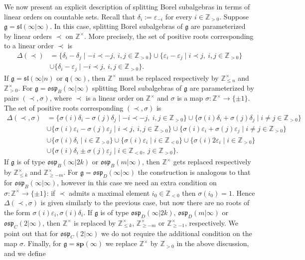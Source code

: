 \documentclass[12pt]{amsart}
\newcommand\Z{\mathbb{Z}}
\newcommand\g{\mathfrak{g}}
\newcommand\fq{\mathfrak{q}}
\newcommand\fsl{\mathfrak{sl}}
\newcommand\fosp{\mathfrak{osp}}
\newcommand\D{\Delta}
\newcommand\bsp{\mathbf{sp}}
\theoremstyle{plain}
\theoremstyle{definition}
\numberwithin{equation}{section}
\begin{document}
We now present an explicit description of splitting Borel subalgebras in terms of linear orders on countable sets. Recall that $\delta_i:=\varepsilon_{-i}$ for every $i\in \Z_{>0}$. Suppose $\g=\fsl(\infty|\infty)$. In this case, splitting Borel subalgebras of $\g$ are parameterized by linear orders $\prec$ on $\Z^\times $. More precisely, the set of positive roots corresponding to a linear order $\prec$ is 
\begin{align*}
\D(\prec) & = \{\delta_i - \delta_j\mid -i\prec -j,\ i,j\in \Z_{>0}\}\cup \{\varepsilon_i - \varepsilon_j\mid i\prec j,\ i,j\in \Z_{>0}\} \\
& \cup \{\delta_i - \varepsilon_j\mid -i\prec j,\ i,j\in \Z_{>0}\}.
\end{align*}
If $\g=\fsl(\infty|n)$ or $\fq(\infty)$, then $\Z^\times$ must be replaced respectively by $\Z_{\leq n}^\times$ and $\Z_{>0}^\times$. For $\g = \fosp_B(\infty|\infty)$ splitting Borel subalgebras of $\g$ are parameterized by pairs $(\prec, \sigma)$, where $\prec$ is a linear order on $\Z^\times $ and $\sigma$ is a map $\sigma : \Z^\times \to \{\pm 1\}$. The set of positive roots corresponding $(\prec, \sigma)$ is
\begin{align*}
\D(\prec, \sigma) & = \{\sigma(i)\delta_i - \sigma(j)\delta_j\mid -i\prec -j,\ i,j\in \Z_{>0}\}\cup \{\sigma(i)\delta_i + \sigma(j)\delta_j\mid i\neq j\in \Z_{>0}\} \\
& \cup \{\sigma(i)\varepsilon_i - \sigma(j)\varepsilon_j\mid i\prec j,\ i,j\in \Z_{>0}\}\cup \{\sigma(i)\varepsilon_i + \sigma(j)\varepsilon_j\mid i\neq j\in \Z_{>0}\} \\
& \cup  \{\sigma(i)\delta_i \mid i\in \Z_{>0}\} \cup  \{\sigma(i)\varepsilon_i \mid i\in \Z_{<0}\} 
\cup  \{\sigma(i)2\varepsilon_i \mid i\in \Z_{>0}\} \\
& \cup \{\sigma(i)\delta_i \pm  \sigma(j)\varepsilon_j\mid i\in \Z_{<0},\ j\in \Z_{>0}\}.
\end{align*}
If $\g$ is of type $\fosp_B(\infty|2k)$ or $\fosp_B(m|\infty)$, then $\Z^\times $ gets replaced respectively by $\Z_{\leq k}^\times$ and $\Z_{\geq -m}^\times$. For $\g=\fosp_D(\infty|\infty)$ the construction is analogous to that for $\fosp_B(\infty|\infty)$, however in this case we need an extra condition on $\sigma : \Z^\times \to \{\pm 1\}$: if $\prec$ admits a maximal element $i_0\in \Z_{<0}$ then $\sigma(i_0)=1$. Hence $\D(\prec, \sigma)$ is given similarly to the previous case, but now there are no roots of the form $\sigma(i)\varepsilon_i, \sigma(i)\delta_i$. If $\g$ is of type $\fosp_D(\infty|2k)$, $\fosp_D(m|\infty)$ or $\fosp_C(2|\infty)$, then $\Z^\times $ is replaced by $\Z_{\leq k}^\times$, $\Z_{\geq -m}^\times$ or $\Z_{\geq -1}^\times$, respectively. We point out that for $\fosp_C(2|\infty)$ we do not require the additional condition on the map $\sigma$. Finally, for $\g=\bsp(\infty)$ we replace $\Z^\times $ by $\Z_{>0}$ in the above discussion, and we define
\end{document}
